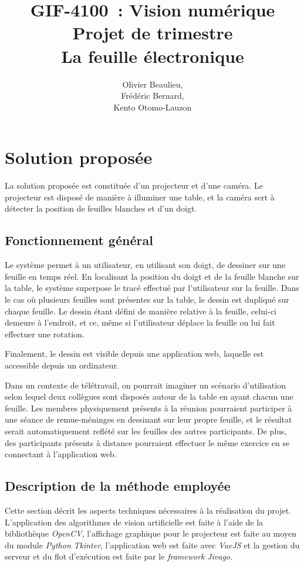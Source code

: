 \documentclass[11pt]{report}
\title{\textbf{GIF-4100 : Vision numérique\\ Projet de trimestre \\La feuille électronique}}
\author{Olivier Beaulieu,\\Frédéric Bernard,\\Kento Otomo-Lauzon}
\begin{document}
\maketitle
 

\newpage

\section{Solution proposée}
La solution proposée est constituée d'un projecteur et d'une caméra. Le
projecteur est disposé de manière à illuminer une table, et la caméra sert à
détecter la position de feuilles blanches et d'un doigt.

\subsection{Fonctionnement général}
Le système permet à un utilisateur, en utilisant son doigt, de dessiner sur une
feuille en temps réel. En localisant la position du doigt et de la feuille
blanche sur la table, le système superpose le tracé effectué par l'utilisateur
sur la feuille. Dans le cas où plusieurs feuilles sont présentes sur la table,
le dessin est dupliqué sur chaque feuille. Le dessin étant défini de manière
relative à la feuille, celui-ci demeure à l'endroit, et ce, même si
l'utilisateur déplace la feuille ou lui fait effectuer une rotation.

Finalement, le dessin est visible depuis une application web, laquelle est
accessible depuis un ordinateur.

Dans un contexte de télétravail, on pourrait imaginer un scénario d'utilisation
selon lequel deux collègues sont disposés autour de la table en ayant chacun une
feuille. Les membres physiquement présents à la réunion pourraient participer à
une séance de remue-méninges en dessinant sur leur propre feuille, et le
résultat serait automatiquement reflété sur les feuilles des autres
participants. De plus, des participants présents à distance pourraient effectuer
le même exercice en se connectant à l'application web. 

\subsection{Description de la méthode employée}
Cette section décrit les aspects techniques nécessaires à la réalisation du
projet. L'application des algorithmes de vision artificielle est faite à l'aide
de la bibliothèque \textit{OpenCV}, l'affichage graphique pour le projecteur est
faite au moyen du module \textit{Python} \textit{Tkinter}, l'application web est
faite avec \textit{VueJS} et la gestion du serveur et du flot d'exécution est
faite par le \textit{framework} \textit{Jivago}. 
\end{document}
